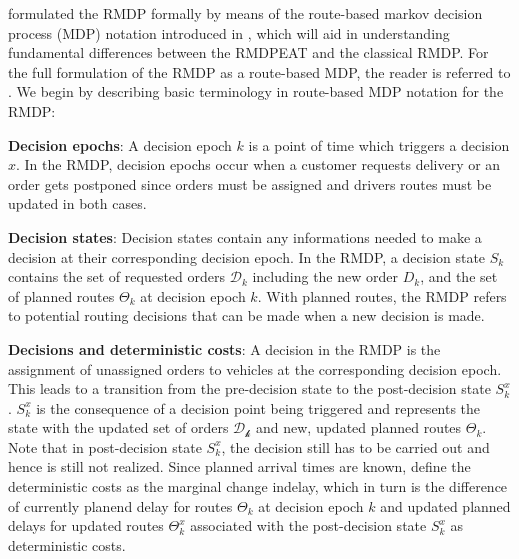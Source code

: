 \cite{UlmerRMDP} formulated the RMDP formally by means of the route-based markov decision process (MDP) notation introduced in \cite{ulmer2017route}, which will aid in understanding fundamental differences between the RMDPEAT and the classical RMDP. For the full formulation of the RMDP as a route-based MDP, the reader is referred to \cite{UlmerBarrett2017_TWAP}. We begin by describing basic terminology in route-based MDP notation for the RMDP:
\begin{description}[font=$\bullet$\scshape\bfseries]
	\item \textbf{Decision epochs}: A decision epoch $ k $ is a point of time which triggers a decision $ x $. In the RMDP, decision epochs occur when a customer requests delivery or an order gets postponed since orders must be assigned and drivers routes must be updated in both cases.
	
	\item \textbf{Decision states}: Decision states contain any informations needed to make a decision at their corresponding decision epoch. In the RMDP, a decision state $ S_k $ contains the set of requested orders $ \mathcal{D}_k $ including the new order $ D_k $, and the set of planned routes $ \Theta_k $ at decision epoch $ k $. With planned routes, the RMDP refers to potential routing decisions that can be made when a new decision is made. 
	
	\item \textbf{Decisions and deterministic costs}: A decision in the RMDP is the assignment of unassigned orders to vehicles at the corresponding decision epoch. This leads to a transition from the pre-decision state to the post-decision state $ S^{x}_k $. $ S^{x}_k $ is the consequence of a decision point being triggered and represents the state with the updated set of orders $ \mathcal{D_k} $ and new, updated planned routes $ \Theta_k $. Note that in post-decision state $ S^{x}_k $, the decision still has to be carried out and hence is still not realized. Since planned arrival times are known, \cite{UlmerBarrett2017_TWAP} define the deterministic costs as the marginal change indelay, which in turn is the difference of currently planend delay for routes $ \Theta_k $ at decision epoch $ k $ and updated planned delays for updated routes $ \Theta^{x}_k $ associated with the post-decision state $ S^{x}_k $ as deterministic costs.
	

\end{description}
